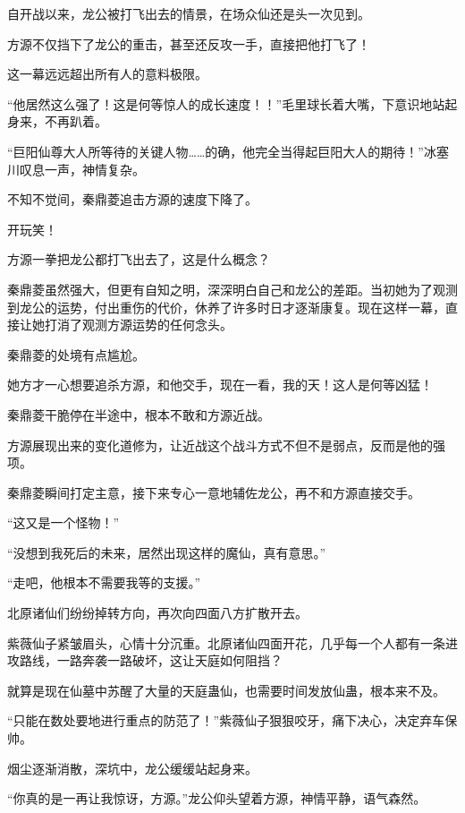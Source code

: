 
\begin{this_body}

自开战以来，龙公被打飞出去的情景，在场众仙还是头一次见到。

方源不仅挡下了龙公的重击，甚至还反攻一手，直接把他打飞了！

这一幕远远超出所有人的意料极限。

“他居然这么强了！这是何等惊人的成长速度！！”毛里球长着大嘴，下意识地站起身来，不再趴着。

“巨阳仙尊大人所等待的关键人物……的确，他完全当得起巨阳大人的期待！”冰塞川叹息一声，神情复杂。

不知不觉间，秦鼎菱追击方源的速度下降了。

开玩笑！

方源一拳把龙公都打飞出去了，这是什么概念？

秦鼎菱虽然强大，但更有自知之明，深深明白自己和龙公的差距。当初她为了观测到龙公的运势，付出重伤的代价，休养了许多时日才逐渐康复。现在这样一幕，直接让她打消了观测方源运势的任何念头。

秦鼎菱的处境有点尴尬。

她方才一心想要追杀方源，和他交手，现在一看，我的天！这人是何等凶猛！

秦鼎菱干脆停在半途中，根本不敢和方源近战。

方源展现出来的变化道修为，让近战这个战斗方式不但不是弱点，反而是他的强项。

秦鼎菱瞬间打定主意，接下来专心一意地辅佐龙公，再不和方源直接交手。

“这又是一个怪物！”

“没想到我死后的未来，居然出现这样的魔仙，真有意思。”

“走吧，他根本不需要我等的支援。”

北原诸仙们纷纷掉转方向，再次向四面八方扩散开去。

紫薇仙子紧皱眉头，心情十分沉重。北原诸仙四面开花，几乎每一个人都有一条进攻路线，一路奔袭一路破坏，这让天庭如何阻挡？

就算是现在仙墓中苏醒了大量的天庭蛊仙，也需要时间发放仙蛊，根本来不及。

“只能在数处要地进行重点的防范了！”紫薇仙子狠狠咬牙，痛下决心，决定弃车保帅。

烟尘逐渐消散，深坑中，龙公缓缓站起身来。

“你真的是一再让我惊讶，方源。”龙公仰头望着方源，神情平静，语气森然。


\end{this_body}
